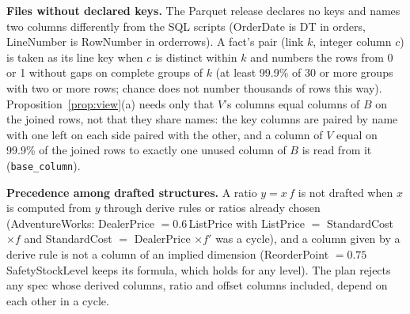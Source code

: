 \noindent\textbf{Files without declared keys.} The Parquet release declares no keys and names two columns differently from the SQL scripts (OrderDate is DT in orders, LineNumber is RowNumber in orderrows). A fact's pair (link $k$, integer column $c$) is taken as its line key when $c$ is distinct within $k$ and numbers the rows from 0 or 1 without gaps on complete groups of $k$ (at least 99.9\% of 30 or more groups with two or more rows; chance does not number thousands of rows this way). Proposition~\ref{prop:view}(a) needs only that $V$'s columns equal columns of $B$ on the joined rows, not that they share names: the key columns are paired by name with one left on each side paired with the other, and a column of $V$ equal on 99.9\% of the joined rows to exactly one unused column of $B$ is read from it (\texttt{base\_column}).

\noindent\textbf{Precedence among drafted structures.} A ratio $y=x\,f$ is not drafted when $x$ is computed from $y$ through derive rules or ratios already chosen (AdventureWorks: DealerPrice $=0.6\,$ListPrice with ListPrice $=$ StandardCost $\times f$ and StandardCost $=$ DealerPrice $\times f'$ was a cycle), and a column given by a derive rule is not a column of an implied dimension (ReorderPoint $=0.75\,$SafetyStockLevel keeps its formula, which holds for any level). The plan rejects any spec whose derived columns, ratio and offset columns included, depend on each other in a cycle.

